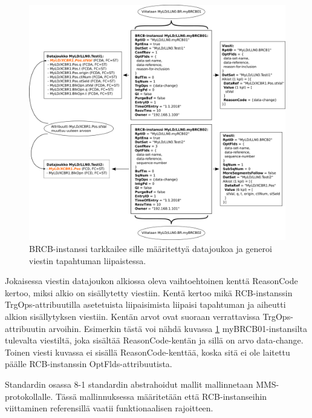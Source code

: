 \begin{figure}
	\includegraphics[width=1\textwidth]{pictures/iec61850-data-set-reporting.png}
	\caption{BRCB-instanssi tarkkailee sille määritettyä datajoukoa ja generoi viestin tapahtuman liipaistessa.}
	\label{fig:iec61850-data-set-reporting}
\end{figure}

Jokaisessa viestin datajoukon alkiossa oleva vaihtoehtoinen kenttä ReasonCode kertoo, miksi alkio on sisällytetty viestiin. Kentä kertoo mikä RCB-instanssin TrgOps-attribuutilla asetetuista liipaisimista liipaisi tapahtuman ja aiheutti alkion sisällytyksen viestiin. Kentän arvot ovat suoraan verrattavissa TrgOps-attribuutin arvoihin. Esimerkin tästä voi nähdä kuvassa \ref{fig:iec61850-data-set-reporting} myBRCB01-instansilta tulevalta viestiltä, joka sisältää ReasonCode-kentän ja sillä on arvo data-change. Toinen viesti kuvassa ei sisällä ReasonCode-kenttää, koska sitä ei ole laitettu päälle RCB-instanssin OptFlds-attribuutista.\cite[s.~28--29]{IEC61850-7-2}

Standardin osassa 8-1 \cite{IEC61850-8-1} standardin abstrahoidut mallit mallinnetaan MMS-protokollalle. Tässä mallinnuksessa määritetään että RCB-instanseihin viittaminen referensillä vaatii funktionaalisen rajoitteen. 


